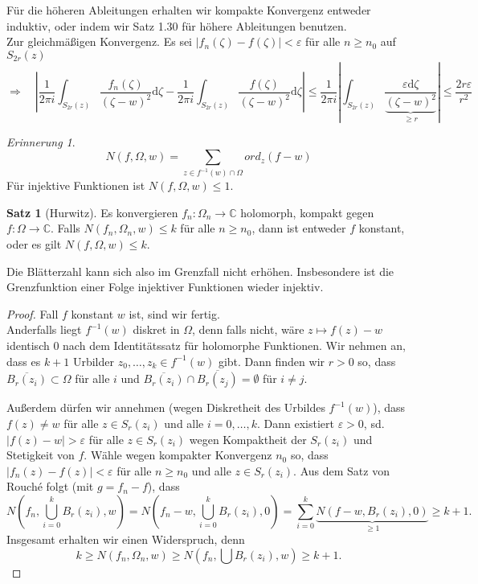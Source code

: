 \documentclass[11pt,titlepage]{article}
\theoremstyle{definition}
\newtheorem{theorem}{Satz}[section]
\theoremstyle{remark}
\newtheorem*{remind}{Erinnerung}
\begin{document}
	Für die höheren Ableitungen erhalten wir kompakte Konvergenz entweder induktiv, oder indem wir Satz 1.30 
	für höhere Ableitungen benutzen. \\
	Zur gleichmäßigen Konvergenz. Es sei $|f_n(\zeta)-f(\zeta)|<\varepsilon$ für alle $n\geq n_0$ auf $S_{2r}(z)$
	\[ \Rightarrow \quad \left| \frac{1}{2\pi i}\int_{S_{2r}(z)}\frac{f_n(\zeta)}{(\zeta-w)^2}\mathrm{d}\zeta - 
	\frac{1}{2\pi i} \int_{S_{2r}(z)} \frac{f(\zeta)}{(\zeta-w)^2}\mathrm{d}\zeta \right| 
	\leq \frac{1}{2\pi i} \left| \int_{S_{2r}(z)} \frac{\varepsilon \mathrm{d}\zeta}{\underbrace{(\zeta-w)^2}_{\geq r}}\right|
	\leq \frac{2r\varepsilon}{r^2} \]
	
	\begin{remind}
		\[ N(f,\Omega,w)=\sum_{z\in f^{-1}(w)\cap\Omega} ord_z(f-w) \]
		Für injektive Funktionen ist $N(f,\Omega,w)\leq 1$.
	\end{remind}
	
	\begin{theorem}[Hurwitz] \label{thm:Hur}
		Es konvergieren $f_n:\Omega_n\to\mathbb{C}$ holomorph, kompakt gegen $f:\Omega\to\mathbb{C}$. Falls 
		$N(f_n,\Omega_n,w)\leq k$ für alle $n\geq n_0$, dann ist entweder $f$ konstant, oder es gilt 
		$N(f,\Omega,w)\leq k$. \\
	\end{theorem}
	
	Die Blätterzahl kann sich also im Grenzfall nicht erhöhen. Insbesondere ist die Grenzfunktion einer Folge 
	injektiver Funktionen wieder injektiv.
	
	\begin{proof}
		Fall $f$ konstant $w$ ist, sind wir fertig. \\
		Anderfalls liegt $f^{-1}(w)$ diskret in $\Omega$, denn falls nicht, wäre $z\mapsto f(z)-w$ identisch $0$ 
		nach dem Identitätssatz für holomorphe Funktionen. Wir nehmen an, dass es $k+1$ Urbilder 
		$z_0,\ldots,z_k\in f^{-1}(w)$ gibt. Dann finden wir $r>0$ so, dass $\overline{B_r(z_i)}\subset\Omega$ für 
		alle $i$ und $\overline{B_r(z_i)}\cap\overline{B_r(z_j)}=\emptyset$ für $i\neq j$.
		
		
		Außerdem dürfen wir annehmen (wegen Diskretheit des Urbildes $f^{-1}(w)$), dass $f(z)\neq w$ für alle 
		$z\in S_r(z_i)$ und alle $i=0,\ldots,k$. Dann existiert $\varepsilon>0$, sd. $|f(z)-w|>\varepsilon$ für alle 
		$z\in S_r(z_i)$ wegen Kompaktheit der $S_r(z_i)$ und Stetigkeit von $f$. Wähle wegen kompakter 
		Konvergenz $n_0$ so, dass $|f_n(z)-f(z)|<\varepsilon$ für alle $n\geq n_0$ und alle $z\in S_r(z_i)$. 
		Aus dem Satz von Rouché folgt (mit $g=f_n -f$), dass
		\[ N(f_n,\bigcup_{i=0}^k B_r(z_i),w)=N(f_n -w, \bigcup_{i=0}^k B_r(z_i),0) 
		= \sum_{i=0}^k \underbrace{N(f-w, B_r(z_i),0)}_{\geq 1} \geq k+1 .\]
		Insgesamt erhalten wir einen Widerspruch, denn
		\[ k\geq N(f_n,\Omega_n,w)\geq N(f_n,\bigcup B_r(z_i),w)\geq k+1. \]
	\end{proof}
	
\end{document}

